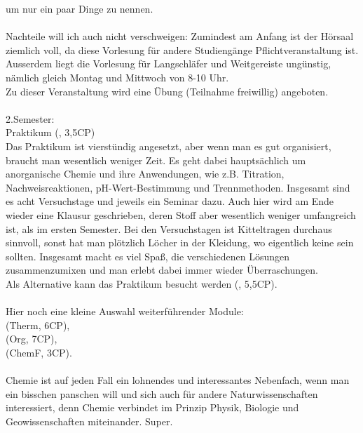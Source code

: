 um nur ein paar Dinge zu nennen.\\
\\
Nachteile will ich auch nicht verschweigen: Zumindest am Anfang ist der 
H\"orsaal ziemlich voll, da diese Vorlesung f\"ur andere Studieng\"ange 
Pflichtveranstaltung ist. Ausserdem liegt die Vorlesung f\"ur Langschl\"afer
und Weitgereiste ung\"unstig, n\"amlich gleich Montag und Mittwoch von 
8-10 Uhr.\\
Zu dieser Veranstaltung wird eine \"Ubung (Teilnahme freiwillig) angeboten.\\
\\
2.Semester:\\
Praktikum  (, 3,5CP)\\
Das Praktikum ist vierst\"undig angesetzt, aber wenn man es gut organisiert, 
braucht man wesentlich weniger Zeit. Es geht dabei haupts\"achlich um
 anorganische Chemie und ihre Anwendungen, wie z.B. Titration, 
Nachweisreaktionen, pH-Wert-Bestimmung und Trennmethoden. Insgesamt sind es 
acht Versuchstage und jeweils ein Seminar dazu. Auch hier wird am Ende wieder 
eine Klausur geschrieben, deren Stoff aber wesentlich weniger umfangreich ist,
als im ersten Semester. Bei den Versuchstagen ist Kitteltragen durchaus 
sinnvoll, sonst hat man pl\"otzlich L\"ocher in der Kleidung, wo eigentlich 
keine sein sollten. Insgesamt macht es viel Spaß, die verschiedenen 
L\"osungen zusammenzumixen und man erlebt dabei immer wieder \"Uberraschungen.\\
Als Alternative kann das Praktikum  besucht 
werden (, 5,5CP).\\
\\
Hier noch eine kleine Auswahl weiterf\"uhrender Module:\\
 (Therm, 6CP),\\
 (Org, 7CP),\\
 (ChemF, 3CP).\\
\\
Chemie ist auf jeden Fall ein lohnendes und interessantes Nebenfach, wenn man 
ein bisschen panschen will und sich auch f\"ur andere Naturwissenschaften 
interessiert, denn Chemie verbindet im Prinzip Physik, Biologie und 
Geowissenschaften miteinander. Super. 

